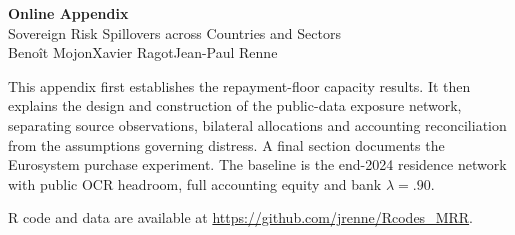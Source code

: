 \documentclass[11pt,a4paper]{article}
\begin{document}
\begin{center}
{\Large\bfseries Online Appendix}\\[0.18cm]
{\large Sovereign Risk Spillovers across Countries and Sectors}\\[0.18cm]
Beno\^it Mojon\qquad Xavier Ragot\qquad Jean-Paul Renne
\end{center}
\medskip
This appendix first establishes the repayment-floor capacity results. It then explains the design and construction of the public-data exposure network, separating source observations, bilateral allocations and accounting reconciliation from the assumptions governing distress. A final section documents the Eurosystem purchase experiment. The baseline is the end-2024 residence network with public OCR headroom, full accounting equity and bank $\lambda=.90$.

R code and data are available at \url{https://github.com/jrenne/Rcodes_MRR}.







\end{document}
